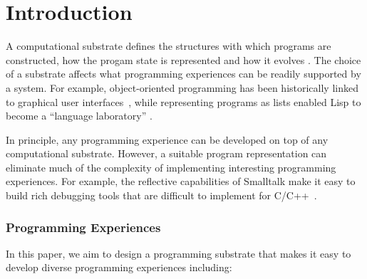 \documentclass[sigconf,anonymous,screen]{acmart}
\begin{document}

\section{Introduction}

A computational substrate defines the structures with which programs are constructed, how
the progam state is represented and how it evolves \cite{jakubovic-2022-ladder}. The choice of
a substrate affects what programming experiences can be readily supported by a system. For example,
object-oriented programming has been historically linked to graphical user
interfaces~\cite{kay-1993-smalltalk}, while representing programs as lists enabled Lisp to become
a ``language laboratory'' \cite{steele-1993-lisp}.

In principle, any programming experience can be developed on top of any computational
substrate. However, a suitable program representation can eliminate much of the complexity of implementing interesting
programming experiences. For example, the reflective capabilities of Smalltalk make it easy
to build rich debugging tools \cite{rauch-2019-babylonian} that are difficult to implement
for C/C++~\cite{kell-2018-unix,kell-2024-debugging}.

\subsubsection*{Programming Experiences}

In this paper, we aim to design a programming substrate that makes it easy to develop diverse
programming experiences \cite{myers-2006-eup} including:
\end{document}
